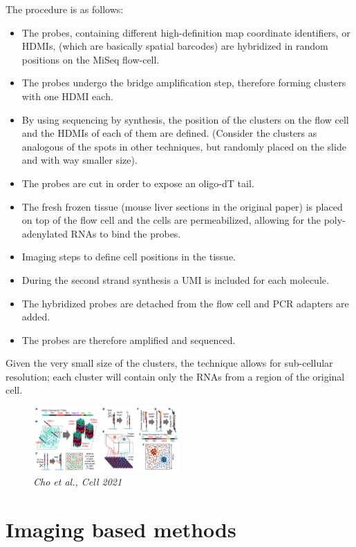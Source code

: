 The procedure is as follows:
\begin{itemize}
\tightlist
\item 
  The probes, containing different high-definition map coordinate identifiers,
  or HDMIs, (which are basically spatial barcodes) are hybridized in random 
  positions on the MiSeq flow-cell.
\item 
  The probes undergo the bridge amplification step, therefore forming 
  clusters with one HDMI each. 
\item 
  By using sequencing by synthesis, the position of the clusters on the flow
  cell and the HDMIs of each of them are defined. (Consider the clusters
  as analogous of the spots in other techniques, but randomly placed on the
  slide and with way smaller size).
\item
  The probes are cut in order to expose an oligo-dT tail.
\item
  The fresh frozen tissue (mouse liver sections in the original paper) is 
  placed on top of the flow cell and the cells are permeabilized, allowing 
  for the poly-adenylated RNAs to bind the probes.
\item 
  Imaging steps to define cell positions in the tissue.
\item
  During the second strand synthesis a UMI is included for each molecule.
\item 
  The hybridized probes are detached from the flow cell and PCR adapters are
  added.
\item
  The probes are therefore amplified and sequenced.
\end{itemize}

Given the very small size of the clusters, the technique allows for 
sub-cellular resolution; each cluster will contain only the RNAs from a 
region of the original cell.

\begin{figure}
\centering
\includegraphics[width=0.5\textwidth]{images/Screenshot_3.png}
\caption{\emph{Cho et al., Cell 2021}}
\end{figure}

\hypertarget{imaging-based-methods}{%
\section{Imaging based methods}\label{imaging-based-methods}}

